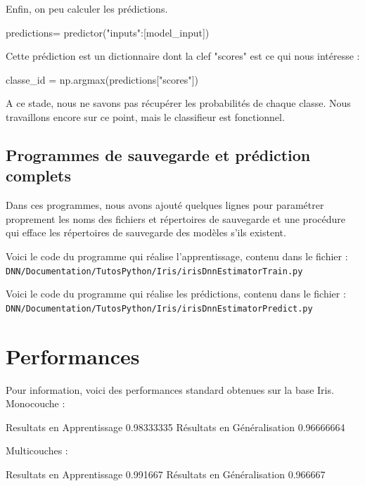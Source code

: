 \documentclass[a4paper,11pt]{book}
\begin{document}
Enfin, on peu calculer les prédictions.
\begin{mypython}
predictions= predictor({"inputs":[model_input]})
\end{mypython}

Cette prédiction est un dictionnaire dont la clef "scores" est ce qui nous intéresse :

\begin{mypython}
classe_id = np.argmax(predictions["scores"])
\end{mypython}

A ce stade, nous ne savons pas récupérer les probabilités de chaque classe. Nous travaillons encore sur ce point, mais le classifieur est fonctionnel.

\subsection{Programmes de sauvegarde et prédiction complets}
Dans ces programmes, nous avons ajouté quelques lignes pour paramétrer proprement les noms des fichiers et répertoires de sauvegarde et une procédure qui efface les répertoires de sauvegarde des modèles s'ils existent.

Voici le code du programme qui réalise l'apprentissage, contenu dans le fichier :\\
\verb+DNN/Documentation/TutosPython/Iris/irisDnnEstimatorTrain.py+




Voici le code du programme qui réalise les prédictions, contenu dans le fichier :\\
\verb+DNN/Documentation/TutosPython/Iris/irisDnnEstimatorPredict.py+



\section{Performances}
\label{secPerfIris}

Pour information, voici des performances standard obtenues sur la base Iris.
Monocouche :
\begin{myoutput}
Resultats en Apprentissage 0.98333335
Résultats en Généralisation 0.96666664
\end{myoutput}

Multicouches :
\begin{myoutput}
Resultats en Apprentissage 0.991667
Résultats en Généralisation 0.966667
\end{myoutput}
\end{document}
